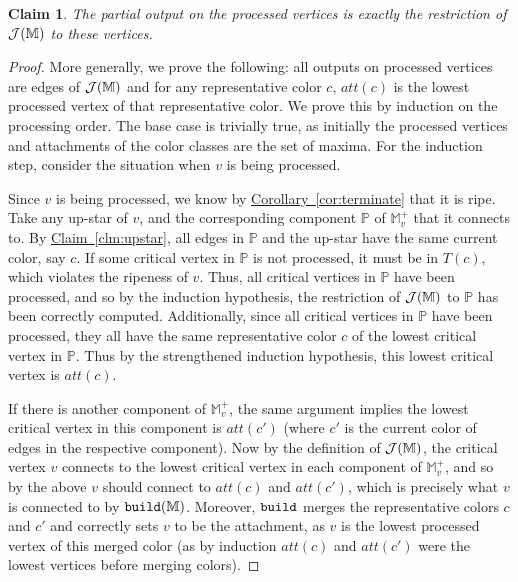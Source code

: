 \documentclass[11pt]{article}
\newtheorem{claim}[theorem]{Claim}
\theoremstyle{definition}
\newcommand{\cJ}{{\cal J}}
\newcommand{\MM}{\mathbb{M}}
\newcommand{\PP}{\mathbb{P}}
\newcommand{\Clm}[1]{\hyperref[clm:#1]{Claim~\ref*{clm:#1}}} %
\newcommand{\Cor}[1]{\hyperref[cor:#1]{Corollary~\ref*{cor:#1}}} %
\newcommand{\build}{{\tt build}}
\newcommand{\h}{att}
\newcommand{\rep}{rep}
\begin{document}
\begin{claim} \label{clm:process} The partial output on the processed vertices is exactly
the restriction of $\cJ(\MM)$ to these vertices.
\end{claim}

\begin{proof} More generally, we prove the following: all outputs on processed vertices
are edges of $\cJ(\MM)$ and for any representative color $c$, $\h(c)$ is the lowest processed vertex
of that representative color. We prove this by induction on the processing order. The base case is trivially
true, as initially the processed vertices and attachments of the color classes are the set of maxima.
For the induction step, consider the situation
when $v$ is being processed.

Since $v$ is being processed, we know by \Cor{terminate} that it is ripe. Take any up-star of $v$, and the corresponding component $\PP$
of $\MM^+_v$ that it connects to. By \Clm{upstar}, all edges in $\PP$ and the up-star
have the same current color, say $c$. If some critical vertex in $\PP$ is not processed,
it must be in $T(c)$, which violates the ripeness of $v$.
Thus, all critical vertices in $\PP$ have been processed, and so by the induction hypothesis, the restriction of $\cJ(\MM)$ to $\PP$ has been correctly computed.
Additionally, since all critical vertices in $\PP$ have been processed, they all have the same representative color $c$ of the lowest critical vertex in $\PP$.
Thus by the strengthened induction hypothesis, this lowest critical vertex is $\h(c)$.

If there is another component of $\MM^+_v$, the same argument implies 
the lowest critical vertex in this component is $\h(c')$ (where $c'$ is the current color of edges in the respective component).
Now by the definition of $\cJ(\MM)$, the critical vertex $v$ connects to the lowest critical vertex in each component of $\MM^+_v$, 
and so by the above $v$ should connect to $\h(c)$ and $\h(c')$, which is precisely what $v$ is connected to by $\build(\MM)$.
Moreover, $\build$ merges the representative colors $c$ and $c'$ and correctly sets $v$ to be the attachment, 
as $v$ is the lowest processed vertex of this merged color (as by induction $\h(c)$ and $\h(c')$ were the lowest vertices before merging colors).
%
%
%
\end{proof}
\end{document}
